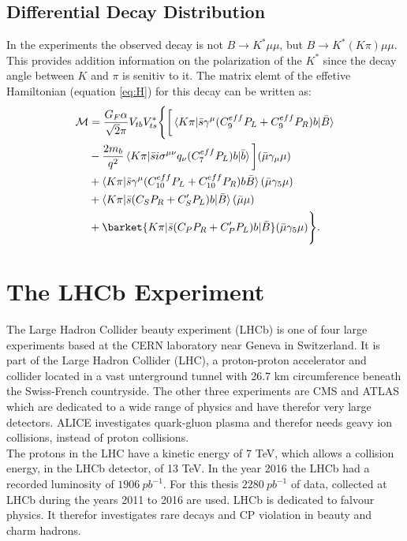 \documentclass[english]{uzhpub}
\begin{document}
\subsection{Differential Decay Distribution}
In the experiments the observed decay is not $B \rightarrow K^* \mu \mu$, but $ B \rightarrow K^*(K \pi) \mu \mu$. This provides addition information on the polarization of the $K^*$ since the decay angle between $K$ and $\pi$ is senitiv to it. The matrix elemt of the effetive Hamiltonian (equation \ref{eq:H}) for this decay can be written as:
\begin{equation}
  \begin{split}
  \mathcal{M} &= \frac{G_F \alpha}{\sqrt{2} \pi} V_{tb} V_{ts}^* \Bigg \{ \bigg [ \braket{K \pi | \bar{s} \gamma^\mu ( C_9^{eff} P_L + C_9^{eff} P_R) b | \bar{B}}  \\
   &- \frac{2 m_b}{q^2} \braket{K \pi| \bar{s} i \sigma^{\mu \nu} q_\nu (C_7^{eff} P_L) b| \bar{b}} \bigg ] (\bar{\mu} \gamma_\mu \mu) \\
   &+ \braket{K \pi | \bar{s} \gamma^\mu ( C_{10}^{eff} P_L + C_{10}^{eff} P_R) b \bar{B}} (\bar{\mu} \gamma_5 \mu) \\
   &+ \braket{K \pi | \bar{s} (C_S P_R + C_S^\prime P_L) b|\bar{B}} (\bar{\mu} \mu) \\
   &+ \barket{K \pi | \bar{s} (C_P P_R + C_P^\prime P_L) b |\bar{B}} (\bar{\mu} \gamma_5 \mu) \Bigg \} . \label{eq:M}
 \end{split}
\end{equation}


\section{The LHCb Experiment}
The Large Hadron Collider beauty experiment (LHCb) is one of four large experiments based at the CERN laboratory near Geneva in Switzerland. It is part of the Large Hadron Collider (LHC), a proton-proton accelerator and collider located in a vast unterground tunnel with 26.7 km circumference beneath the Swiss-French countryside.
The other three experiments are CMS and ATLAS which are dedicated to a wide range of physics and have therefor very large detectors. ALICE investigates quark-gluon plasma and therefor needs geavy ion collisions, instead of proton collisions. \\
The protons in the LHC have a kinetic energy of 7 TeV, which allows a collision energy, in the LHCb detector, of 13 TeV. In the year 2016 the LHCb had a recorded luminosity of $\SI{1906}{pb^{-1}}$. For this thesis $\SI{2280}{pb^{-1}}$ of data, collected at LHCb during the years 2011 to 2016 are used.
LHCb is dedicated to falvour physics. It therefor investigates rare decays and CP violation in beauty and charm hadrons.
\end{document}

